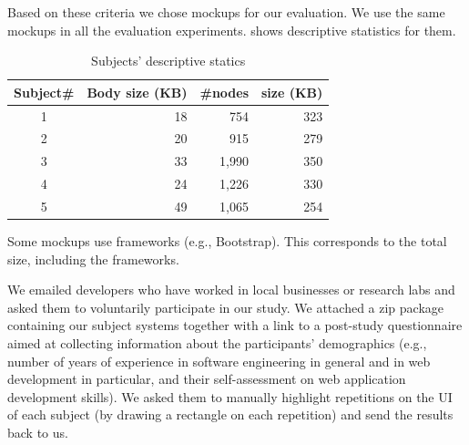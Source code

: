 Based on these criteria we chose \numberOfTemplates mockups for our evaluation. We use the same mockups in all the evaluation experiments.
 shows descriptive statistics
for them.

\begin{table}
	\caption{Subjects' descriptive statics}
	\centering
	\begin{threeparttable}
		\bgroup
		\begin{tabular}{c r r r}
			\toprule
			\textbf{Subject\#} & \textbf{Body size (KB)} & \textbf{\#\dom nodes} & \textbf{\css size (KB)\tnote\textdagger} \\ \toprule
			        1          & 18                       & 754                   & 323                                      \\
			        2          & 20                       & 915                   & 279                                      \\
			        3          & 33                       & 1,990                 & 350                                      \\
			        4          & 24                       & 1,226                 & 330                                      \\
			        5          & 49                       & 1,065                 & 254                                      \\ \bottomrule
		\end{tabular}
		\egroup
		\begin{tablenotes}
			\item[\textdagger] Some mockups use \css frameworks (e.g., Bootstrap).
			This corresponds to the total \css size, including the frameworks.
		\end{tablenotes}
	\end{threeparttable}
	\label{table:mockup-complexity}
\end{table}



We emailed developers who have worked in local businesses or research labs
and asked them to voluntarily participate in our study.
We attached a zip package containing our subject systems 
together with a link to a post-study questionnaire aimed at collecting information about the participants' demographics
(e.g., number of years of experience in software engineering in general and in web development in particular,
and their self-assessment on web application development skills).
We asked them to manually highlight repetitions on the UI of each subject (by drawing a rectangle on each repetition) and send the results back to us.

